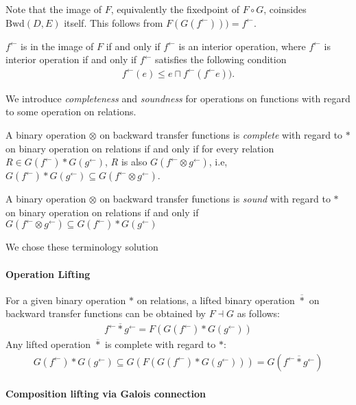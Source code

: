 \documentclass{llncs}
\newcommand{\Unidir}{\mathrm{Bwd}}
\newcommand{\fb}{{f^{\leftarrow}}}
\newcommand{\gb}{{g^{\leftarrow}}}
\newcommand{\comp}{\circ}
\newcommand{\starlift}{\mathbin{\overline{*}}}
\begin{document}
  Note that the image of $F$, equivalently the fixedpoint of $F \comp G$, coinsides $\Unidir(D , E)$ itself. This follows from $F (G (\fb))) = \fb$.

  \begin{proposition}\label{prop:interior-op}
  $\fb$ is in the image of $F$ if and only if $\fb$ is an interior operation,
  where $\fb$ is interior operation if and only if $\fb$ satisfies the following condition
  \begin{align*}
    \fb(e) \leq  e \sqcap \fb (\fb e)).
  \end{align*}
  \end{proposition}

  We introduce \emph{completeness} and \emph{soundness} for operations on functions with regard to some operation on relations.
  \begin{definition}[Completeness]
   A binary operation $\otimes$ on backward transfer functions is \emph{complete} with regard to $*$ on binary operation on relations if and only if for every relation $R \in G(\fb) * G(\gb)$, $R$ is also $G (\fb \otimes \gb)$, i.e, $G(\fb) * G(\gb) \subseteq G (\fb \otimes \gb)$.
  \end{definition}

  \begin{definition}[Soundness]
  A binary operation $\otimes$ on backward transfer functions is \emph{sound} with regard to $*$ on binary operation on relations if and only if
  $G (\fb \otimes \gb) \subseteq G(\fb) * G(\gb)$
  \end{definition}

  We chose these terminology solution
  \paragraph{Operation Lifting}
  For a given binary operation $*$ on relations, a lifted binary operation $\starlift$ on backward transfer functions can be obtained by $F \dashv G$ as follows:
  \begin{align*}
  \fb \starlift \gb = F (G(\fb) * G(\gb))
  \end{align*}
  Any lifted operation $\starlift$ is complete with regard to $*$:
  \begin{align*}
  G(\fb) * G(\gb) \subseteq G(F(G(\fb) * G(\gb))) = G(\fb \starlift \gb)
  \end{align*}


\paragraph{Composition lifting via Galois connection}
\end{document}
